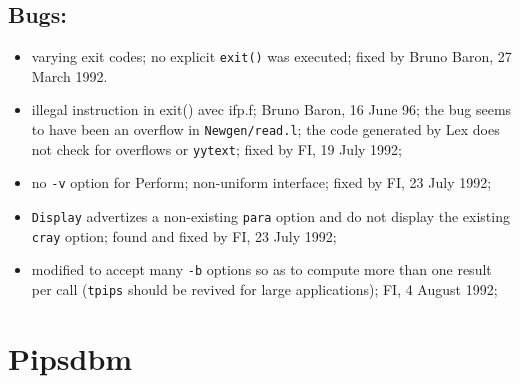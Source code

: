 \subsection{Bugs:}

\begin{itemize}

  \item varying exit codes; no explicit \verb+exit()+ was executed;
	fixed by Bruno Baron, 27 March 1992.

  \item illegal instruction in exit() avec ifp.f; Bruno Baron, 16 June 96;
	the bug seems to have been an overflow in \verb+Newgen/read.l+;
	the code generated by Lex does not check for overflows or
	\verb=yytext=;
	fixed by FI, 19 July 1992;

  \item no \verb+-v+ option for Perform; non-uniform interface;
	fixed by FI, 23 July 1992;

  \item \verb+Display+ advertizes a non-existing \verb+para+ option
	and do not display the existing \verb+cray+ option;
	found and fixed by FI, 23 July 1992;

  \item modified to accept many \verb+-b+ options so as to compute
	more than one result per call (\verb+tpips+ should be revived
	for large applications); FI, 4 August 1992;

\end{itemize}

\section{Pipsdbm}

